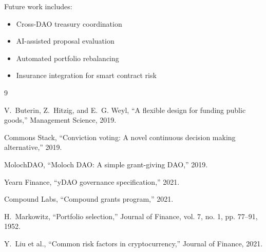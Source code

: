 \documentclass[11pt,a4paper]{article}
\theoremstyle{definition}
\theoremstyle{remark}
\begin{document}
Future work includes:
\begin{itemize}
    \item Cross-DAO treasury coordination
    \item AI-assisted proposal evaluation
    \item Automated portfolio rebalancing
    \item Insurance integration for smart contract risk
\end{itemize}


\begin{thebibliography}{9}

V.~Buterin, Z.~Hitzig, and E.~G. Weyl, ``A flexible design for funding public goods,'' Management Science, 2019.

Commons Stack, ``Conviction voting: A novel continuous decision making alternative,'' 2019.

MolochDAO, ``Moloch DAO: A simple grant-giving DAO,'' 2019.

Yearn Finance, ``yDAO governance specification,'' 2021.

Compound Labs, ``Compound grants program,'' 2021.

H.~Markowitz, ``Portfolio selection,'' Journal of Finance, vol. 7, no. 1, pp. 77--91, 1952.

Y.~Liu et al., ``Common risk factors in cryptocurrency,'' Journal of Finance, 2021.

\end{thebibliography}
\end{document}
